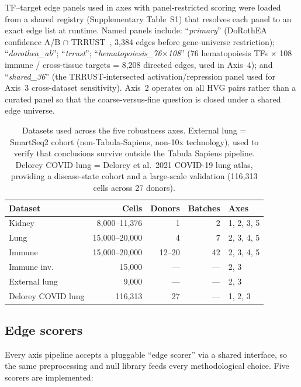 \documentclass[unnumsec,webpdf,contemporary,large,namedate]{oup-authoring-template}
\begin{document}
TF--target edge panels used in axes with panel-restricted scoring were
loaded from a shared registry (Supplementary Table~S1) that resolves each
panel to an exact edge list at runtime. Named panels include:
``\emph{primary}'' (DoRothEA~\citep{GarciaAlonso2019} confidence A/B
$\cap$ TRRUST~\citep{Han2018}, 3{,}384 edges before gene-universe
restriction); ``\emph{dorothea\_ab}''; ``\emph{trrust}'';
``\emph{hematopoiesis\_76$\times$108}'' (76 hematopoiesis TFs $\times$ 108
immune / cross-tissue targets = 8{,}208 directed edges, used in
Axis~4); and ``\emph{shared\_36}'' (the TRRUST-intersected
activation/repression panel used for Axis~3 cross-dataset sensitivity).
Axis~2 operates on all HVG pairs rather than a curated panel so that the
coarse-versus-fine question is closed under a shared edge universe.

\begin{table}[ht]
\centering
\caption{Datasets used across the five robustness axes. External lung =
\citet{Travaglini2020} SmartSeq2 cohort (non-Tabula-Sapiens, non-10x
technology), used to verify that conclusions survive outside the
Tabula Sapiens pipeline. Delorey COVID lung = Delorey et al.\ 2021
COVID-19 lung atlas, providing a disease-state cohort and a
large-scale validation (116{,}313 cells across 27 donors).}
\label{tab:datasets}
\small
\begin{tabular}{lrrrl}
\toprule
\textbf{Dataset} & \textbf{Cells} & \textbf{Donors} & \textbf{Batches} & \textbf{Axes} \\
\midrule
Kidney              & 8{,}000--11{,}376  & 1    & 2  & 1, 2, 3, 5 \\
Lung                & 15{,}000--20{,}000 & 4    & 7  & 2, 3, 4, 5 \\
Immune              & 15{,}000--20{,}000 & 12--20 & 42 & 2, 3, 4, 5 \\
Immune inv.         & 15{,}000           & ---  & --- & 2, 3 \\
External lung       & 9{,}000            & ---  & --- & 2, 3 \\
Delorey COVID lung  & 116{,}313          & 27   & --- & 1, 2, 3 \\
\bottomrule
\end{tabular}
\end{table}

\subsection{Edge scorers}

Every axis pipeline accepts a pluggable ``edge scorer'' via a shared
interface, so the same preprocessing and null library feeds every
methodological choice. Five scorers are implemented:
\end{document}
